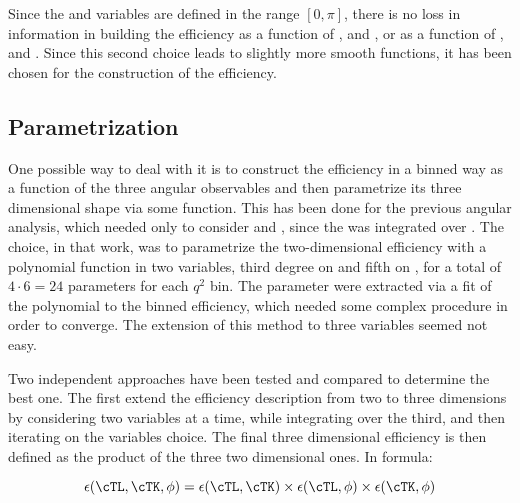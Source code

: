 
Since the \TK and \TK variables are defined in the range $[0,\pi]$, there is no loss in information in building the efficiency as a function of \TK, \TL and \PHI, or as a function of \cTK, \cTL and \PHI. Since this second choice leads to slightly more smooth functions, it has been chosen for the construction of the efficiency. 

\subsection{Parametrization}\label{sec:eff_param}


One possible way to deal with it is to construct the efficiency in a binned way as a function of the three angular observables and then parametrize its three dimensional shape via some function.
This has been done for the previous angular analysis, which needed only to consider \cTL and \cTL, since the \pdf was integrated over \PHI.
The choice, in that work, was to parametrize the two-dimensional efficiency with a polynomial function in two variables, third degree on \cTK and fifth on \cTL, for a total of $4\cdot6=24$ parameters for each $q^2$ bin.
The parameter were extracted via a fit of the polynomial to the binned efficiency, which needed some complex procedure in order to converge.
The extension of this method to three variables seemed not easy.

Two independent approaches have been tested and compared to determine the best one.
The first extend the efficiency description from two to three dimensions by
considering two variables at a time, while integrating over the third, and then
iterating on the variables choice. The final three dimensional efficiency is
then defined as the product of the three two dimensional ones. In formula:

\begin{equation}\label{eq:eff2d}
    \epsilon(\cTL,\cTK,\phi)=\epsilon(\cTL,\cTK)\times\epsilon(\cTL,\phi)\times\epsilon(\cTK,\phi)
\end{equation}

